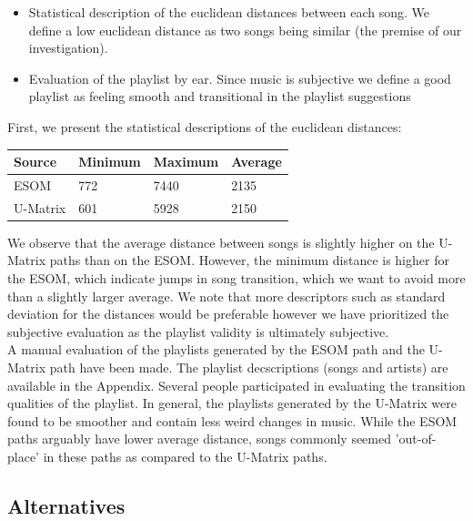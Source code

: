 \begin{itemize}
\item Statistical description of the euclidean distances between each song. We define a low euclidean distance as two songs being similar (the premise of our investigation).\\
\item Evaluation of the playlist by ear. Since music is subjective we define a good playlist as feeling smooth and transitional in the playlist suggestions \\
\end{itemize}

First, we present the statistical descriptions of the euclidean distances: 

\begin{center}
    \begin{tabular}{  l | l | l | p{5cm} }
    Source & Minimum & Maximum & Average  \\ \hline
    ESOM & 772 & 7440 & 2135 \\ 
    U-Matrix & 601 & 5928 & 2150 \\ 
   
    \end{tabular}
\end{center}

We observe that the average distance between songs is slightly higher on the U-Matrix paths than on the ESOM. However, the minimum distance is higher for the ESOM, which indicate jumps in song transition, which we want to avoid more than a slightly larger average. We note that more descriptors such as standard deviation for the distances would be  preferable however we have prioritized the subjective evaluation as the playlist validity is ultimately subjective.\\

A manual evaluation of the playlists generated by the ESOM path and the U-Matrix path have been made. The playlist decscriptions (songs and artists) are available in the Appendix. Several people participated in evaluating the transition qualities of the playlist. In general, the playlists generated by the U-Matrix were found to be smoother and contain less weird changes in music. While the ESOM paths arguably have lower average distance, songs commonly seemed 'out-of-place' in these paths as compared to the U-Matrix paths. \\

\subsection{Alternatives}

